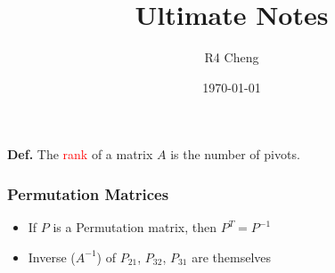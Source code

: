 \documentclass[12pt,a4paper]{article}
\title{Ultimate Notes}
\author{R4 Cheng}
\date{\today}
\begin{document}
\maketitle

\textbf{Def.} The \textcolor{red}{rank} of a matrix $A$ is the number of pivots.


\subsubsection*{Permutation Matrices}

\begin{itemize}
  \item If $P$ is a Permutation matrix, then $P^T = P^{-1}$
  \item Inverse ($A^{-1}$) of $P_{21}$, $P_{32}$, $P_{31}$ are themselves 
\end{itemize}
\end{document}
